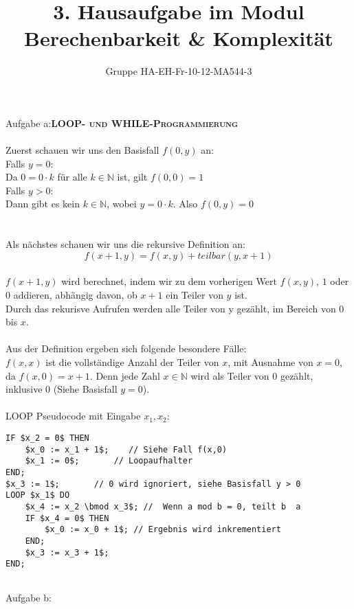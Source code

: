 \documentclass[a4paper,onecolumn,oneside,12pt,ngerman]{article}
\date{}
\title{3. Hausaufgabe im Modul \\ \glqq Berechenbarkeit \& Komplexität\grqq} %
\author{Gruppe HA-EH-Fr-10-12-MA544-3} %
\theoremstyle{plain} %
\theoremstyle{definition} %
\theoremstyle{remark} %
\theoremstyle{plain}
\newcommand{\NN}{\mathbb{N}} %
\begin{document}

\maketitle
\newpage
Aufgabe a:\quad \textsc{\textbf{LOOP- und WHILE-Programmierung}}
\\ \\
Zuerst schauen wir uns den Basisfall $f(0,y)$ an: \\
Falls $y = 0$: \\
Da $0 = 0 \cdot k$ für alle $k \in \NN$ ist, gilt $f(0,0) = 1$\\
Falls $y > 0$:\\
Dann gibt es kein $k \in \NN$, wobei $y = 0 \cdot k$. Also $f(0,y) = 0$ \\ \\ 
\\
Als nächstes schauen wir uns die rekursive Definition an: \\ 
\[ f(x+1,y) = f (x,y) + teilbar(y, x+1) \]
\\
$f(x+1,y)$ wird berechnet, indem wir zu dem vorherigen Wert $f(x,y)$, $1$ oder $0$ addieren, abhängig davon, ob $x+1$ ein Teiler von $y$ ist.
\\
Durch das rekurisve Aufrufen werden alle Teiler von y gezählt, im Bereich von $0$ bis $x$.
\\ \\
Aus der Definition ergeben sich folgende besondere Fälle:
\\
$f(x,x)$ ist die vollständige Anzahl der Teiler von $x$, mit Ausnahme von $x=0$, da $f(x,0) = x+1$. Denn jede Zahl $x \in \NN$ wird als Teiler von $0$ gezählt, inklusive $0$ (Siehe Basisfall $y=0$). 
\\ \\ 

\noindent LOOP Pseudocode mit Eingabe $x_1, x_2$:
\begin{lstlisting}
IF $x_2 = 0$ THEN                   
    $x_0 := x_1 + 1$;    // Siehe Fall f(x,0)
    $x_1 := 0$;       // Loopaufhalter
END;
$x_3 := 1$;       // 0 wird ignoriert, siehe Basisfall y > 0
LOOP $x_1$ DO           
    $x_4 := x_2 \bmod x_3$; //  Wenn a mod b = 0, teilt b  a
    IF $x_4 = 0$ THEN 
        $x_0 := x_0 + 1$; // Ergebnis wird inkrementiert
    END;
    $x_3 := x_3 + 1$;   
END;


\end{lstlisting}

\newpage
Aufgabe b:
\\
\end{document}

